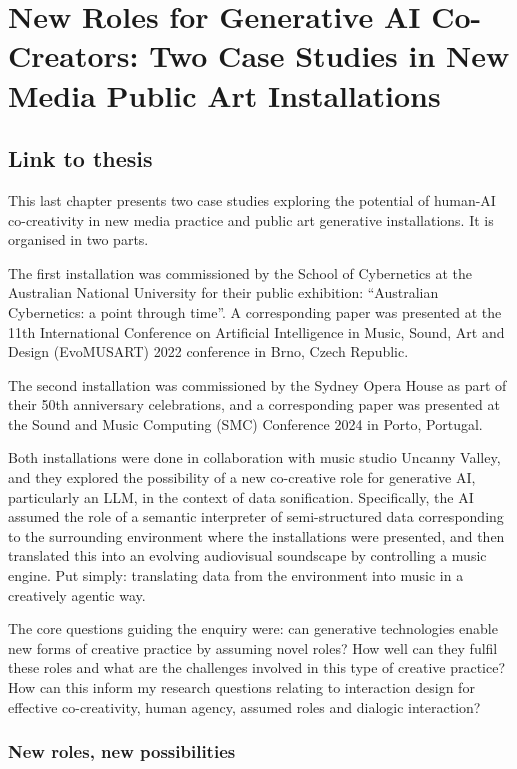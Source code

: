 \chapter{New Roles for Generative AI Co-Creators: Two Case Studies in New Media Public Art Installations}

\section{Link to thesis}
This last chapter presents two case studies exploring the potential of human-AI co-creativity in new media practice and public art generative installations. It is organised in two parts.

The first installation was commissioned by the School of Cybernetics at the Australian National University for their public exhibition: “Australian Cybernetics: a point through time”. A corresponding paper was presented at the 11th International Conference on Artificial Intelligence in Music, Sound, Art and Design (EvoMUSART) 2022 conference in Brno, Czech Republic.

The second installation was commissioned by the Sydney Opera House as part of their 50th anniversary celebrations, and a corresponding paper was presented at the Sound and Music Computing (SMC) Conference 2024 in Porto, Portugal.

Both installations were done in collaboration with music studio Uncanny Valley, and they explored the possibility of a new co-creative role for generative AI, particularly an LLM, in the context of data sonification. Specifically, the AI assumed the role of a semantic interpreter of semi-structured data corresponding to the surrounding environment where the installations were presented, and then translated this into an evolving audiovisual soundscape by controlling a music engine. Put simply: translating data from the environment into music in a creatively agentic way.

The core questions guiding the enquiry were: can generative technologies enable new forms of creative practice by assuming novel roles? How well can they fulfil these roles and what are the challenges involved in this type of creative practice? How can this inform my research questions relating to interaction design for effective co-creativity, human agency, assumed roles and dialogic interaction?

\subsection{New roles, new possibilities}

